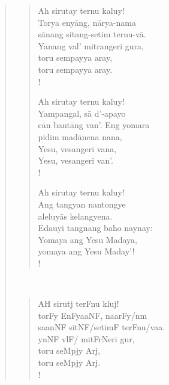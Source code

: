 \documentclass[12pt,paper=a4]{scrartcl}
\begin{document}
\begin{quote}
\begin{minipage}[t]{.5\linewidth}
\begin{verse}
\renewcommand*{\vrightskip}{-2em}
\verselinenumbersleft
{}
\begin{patverse}
Ah sirutay ternu kaluy!\\
Torya enyāng, nārya-nama\\
sānang sitang-setim ternu-vā.\\
Yanang val' mitrangeri gura,\\
toru sempayya aray,\\
toru sempayya aray.\\!
\end{patverse}

\begin{patverse}
Ah sirutay ternu kaluy!\\
Yampangal, sā d'-apayo\\
cān bantāng van'. Eng yomara\\
pidim madānena nana,\\
Yesu, vesangeri vana,\\
Yesu, vesangeri van'.\\!
\end{patverse}

\begin{patverse}
Ah sirutay ternu kaluy!\\
Ang tangyan nantongye\\
aleluyās kelangyena.\\
Edauyi tangnang baho naynay:\\
Yomaya ang Yesu Madaya,\\
yomaya ang Yesu Maday'!\\!
\end{patverse}
\end{verse}
\end{minipage}
~
\begin{minipage}[t]{.5\linewidth}
\Tagati %
\begin{verse}
\begin{patverse}
AH sirutj terFnu kluj!\\
torFy EnFyaaNF, naarFy/nm\\
saanNF sitNF/setimF terFnu/vaa.\\
ynNF vlF/ mitFrNeri gur,\\
toru seMpjy Arj,\\
toru seMpjy Arj.\\!
\end{patverse}


\end{verse}
\end{minipage}
\end{quote}
\end{document}
